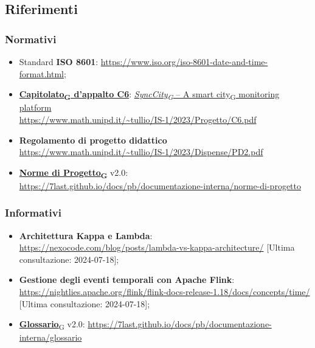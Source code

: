 \subsection{Riferimenti}
\subsubsection{Normativi} %
\begin{itemize}
	\item Standard \textbf{ISO 8601}: \url{https://www.iso.org/iso-8601-date-and-time-format.html};
	\item \href{https://7last.github.io/docs/rtb/documentazione-interna/glossario\#capitolato}{\textbf{Capitolato\textsubscript{G} d'appalto C6}}: \href{https://7last.github.io/docs/rtb/documentazione-interna/glossario\#synccity}{\textit{SyncCity\textsubscript{G} } – A \href{https://7last.github.io/docs/rtb/documentazione-interna/glossario\#smart-city}{smart city\textsubscript{G}} monitoring platform}\\
	      \url{https://www.math.unipd.it/~tullio/IS-1/2023/Progetto/C6.pdf}
	\item \textbf{Regolamento di progetto didattico}\\
	      \url{https://www.math.unipd.it/~tullio/IS-1/2023/Dispense/PD2.pdf}
	\item \href{https://7last.github.io/docs/rtb/documentazione-interna/glossario\#norme-di-progetto}{\textbf{Norme di Progetto\textsubscript{G}}} v2.0:\\
	      \url{https://7last.github.io/docs/pb/documentazione-interna/norme-di-progetto}
\end{itemize}
\subsubsection{Informativi}
\begin{itemize}
	\item \textbf{Architettura Kappa e Lambda}: \\\url{https://nexocode.com/blog/posts/lambda-vs-kappa-architecture/} [Ultima consultazione: 2024-07-18];
	\item \textbf{Gestione degli eventi temporali con Apache Flink}: \url{https://nightlies.apache.org/flink/flink-docs-release-1.18/docs/concepts/time/} [Ultima consultazione: 2024-07-18];
	\item \href{https://7last.github.io/docs/pb/documentazione-interna/glossario\#glossario}{\textbf{Glossario}\textsubscript{G}} v2.0: \url{https://7last.github.io/docs/pb/documentazione-interna/glossario}
\end{itemize}
